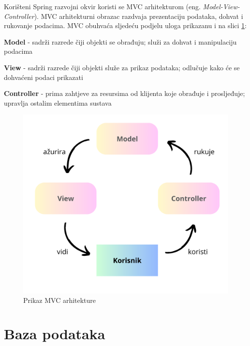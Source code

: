		 
		\noindent Korišteni Spring razvojni okvir koristi se MVC arhitekturom (eng. \textit{Model-View-Controller}). MVC arhitekturni obrazac razdvaja prezentaciju podataka, dohvat i rukovanje podacima. MVC obuhvaća sljedeću podjelu uloga prikazanu i na slici \ref{arh}:
		
		\begin{packed_item}
			\item \textbf{Model} - sadrži razrede čiji objekti se obrađuju; služi za dohvat i manipulaciju podacima
			\item \textbf{View} - sadrži razrede čiji objekti služe za prikaz podataka; odlučuje kako će se dohvaćeni podaci prikazati
			\item \textbf{Controller} - prima zahtjeve za resursima od klijenta koje
			obrađuje i prosljeđuje; upravlja ostalim elementima sustava
		\end{packed_item}
		
		
		\begin{figure}[H]
			\includegraphics[width=\textwidth]{slike/mvc-arh.PNG}
			\centering
			\caption{Prikaz MVC arhitekture}
			\label{arh}
		\end{figure}
		
		\newpage
		
		\section{Baza podataka}
			
